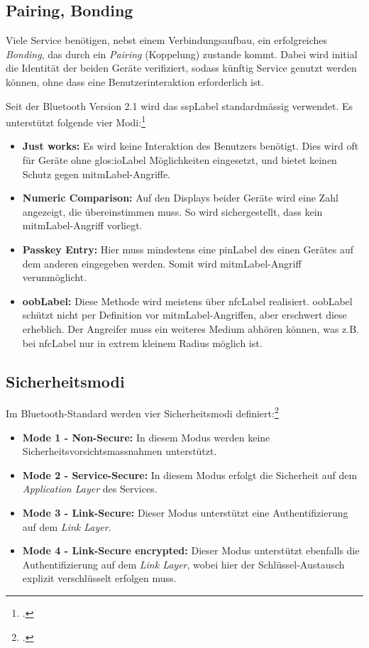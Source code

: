 \subsection{Pairing, Bonding}
Viele Service benötigen, nebst einem Verbindungsaufbau, ein erfolgreiches \textit{Bonding}, das durch ein \textit{Pairing} (Koppelung) zustande kommt.
Dabei wird initial die Identität der beiden Geräte verifiziert, sodass künftig Service genutzt werden können, ohne dass eine Benutzerinteraktion erforderlich ist.

Seit der Bluetooth Version 2.1 wird das \gls{sspLabel} standardmässig verwendet. Es unterstützt folgende vier Modi:\footcite{Bluetooth_Wikipedia_2015-04-17}
\begin{itemize}
	\item \textbf{Just works:} Es wird keine Interaktion des Benutzers benötigt. Dies wird oft für Geräte ohne \gls{glos:ioLabel} Möglichkeiten eingesetzt, und bietet keinen Schutz gegen \gls{mitmLabel}-Angriffe.
	\item \textbf{Numeric Comparison:} Auf den Displays beider Geräte wird eine Zahl angezeigt, die übereinstimmen muss. So wird sichergestellt, dass kein \gls{mitmLabel}-Angriff vorliegt.
	\item \textbf{Passkey Entry:} Hier muss mindestens eine \gls{pinLabel} des einen Gerätes auf dem anderen eingegeben werden. Somit wird \gls{mitmLabel}-Angriff verunmöglicht.
	\item \textbf{\gls{oobLabel}:} Diese Methode wird meistens über \gls{nfcLabel} realisiert.
		\gls{oobLabel} schützt nicht per Definition vor \gls{mitmLabel}-Angriffen, aber erschwert diese erheblich. Der Angreifer muss ein weiteres Medium abhören können, was z.B. bei \gls{nfcLabel} nur in extrem kleinem Radius möglich ist.
\end{itemize}


\subsection{Sicherheitsmodi}
Im Bluetooth-Standard werden vier Sicherheitsmodi definiert:\footcite{Security_Bluetooth_Development_Portal_2015-04-24}
\begin{itemize}
	\item \textbf{Mode 1 - Non-Secure:} In diesem Modus werden keine Sicherheitsvorsichtsmassnahmen unterstützt.
	\item \textbf{Mode 2 - Service-Secure:} In diesem Modus erfolgt die Sicherheit auf dem \textit{Application Layer} des Services.
	\item \textbf{Mode 3 - Link-Secure:} Dieser Modus unterstützt eine Authentifizierung auf dem \textit{Link Layer}.
	\item \textbf{Mode 4 - Link-Secure encrypted:} Dieser Modus unterstützt ebenfalls die Authentifizierung auf dem \textit{Link Layer}, wobei hier der Schlüssel-Austausch explizit verschlüsselt erfolgen muss.
\end{itemize}


